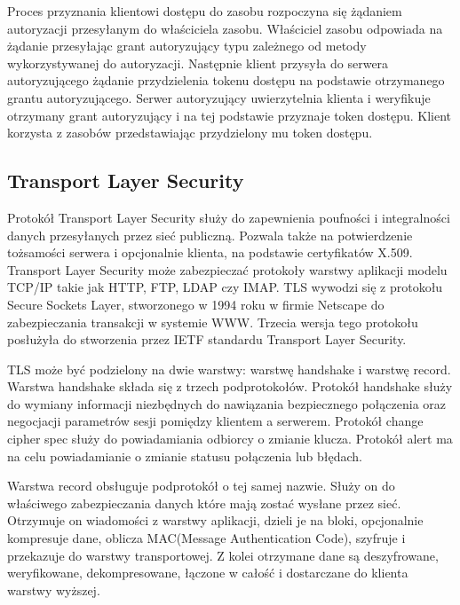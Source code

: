 		Proces przyznania klientowi dostępu do zasobu rozpoczyna się żądaniem autoryzacji przesyłanym do właściciela zasobu.  Właściciel zasobu odpowiada na żądanie przesyłając grant autoryzujący typu zależnego od metody wykorzystywanej do autoryzacji. Następnie klient przysyła do serwera autoryzującego żądanie przydzielenia tokenu dostępu na podstawie otrzymanego grantu autoryzującego. Serwer autoryzujący uwierzytelnia klienta i weryfikuje otrzymany grant autoryzujący i na tej podstawie przyznaje token dostępu. Klient korzysta z zasobów przedstawiając przydzielony mu token dostępu.


\label{sec:poufnosc}
\subsection{Transport Layer Security}

Protokół Transport Layer Security służy do zapewnienia poufności i integralności danych przesyłanych przez sieć publiczną. Pozwala także na potwierdzenie tożsamości serwera i opcjonalnie klienta, na podstawie certyfikatów X.509. Transport Layer Security może zabezpieczać protokoły warstwy aplikacji modelu TCP/IP takie jak HTTP, FTP, LDAP czy IMAP. 
TLS wywodzi się z protokołu Secure Sockets Layer, stworzonego w 1994 roku w firmie Netscape do zabezpieczania transakcji w systemie WWW. Trzecia wersja tego protokołu posłużyła do stworzenia przez IETF standardu Transport Layer Security. 

TLS może być podzielony na dwie warstwy: warstwę handshake i warstwę record\cite{citeulike:6536152}. Warstwa handshake składa się z trzech podprotokołów. Protokół handshake służy do wymiany informacji niezbędnych do nawiązania bezpiecznego połączenia oraz negocjacji parametrów sesji pomiędzy klientem a serwerem. Protokół change cipher spec służy do powiadamiania odbiorcy o zmianie klucza. Protokół alert ma na celu powiadamianie o zmianie statusu połączenia lub błędach. 

Warstwa record obsługuje podprotokół o tej samej nazwie. Służy on do właściwego zabezpieczania danych które mają zostać wysłane przez sieć. Otrzymuje on wiadomości z warstwy aplikacji, dzieli je na bloki, opcjonalnie kompresuje dane, oblicza MAC(Message Authentication Code), szyfruje i przekazuje do warstwy transportowej. Z kolei otrzymane dane są deszyfrowane, weryfikowane, dekompresowane, łączone w całość i dostarczane do klienta warstwy wyższej. 

